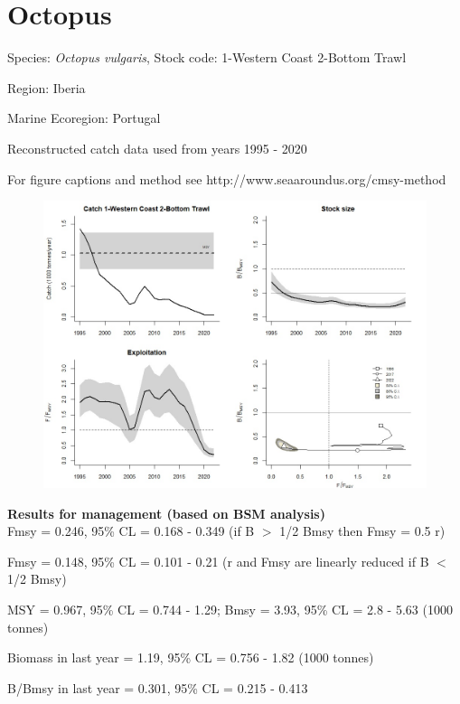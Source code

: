 \documentclass[12pt,a4paper]{article}\usepackage[]{graphicx}\usepackage[]{xcolor}
\begin{document}
    \section*{Octopus}


    Species: \emph{Octopus vulgaris}, Stock code: 1-Western Coast 2-Bottom Trawl

Region: Iberia

Marine Ecoregion: Portugal

Reconstructed catch data used from years 1995 - 2020 

 For figure captions and method see http://www.seaaroundus.org/cmsy-method

    \begin{figure}[ht]
    \centering
    \includegraphics[width=1.00\textwidth ext=.jpg type=jpg]{1-Western Coast 2-Bottom Trawl_MAN.jpg}
    \end{figure}

    \textbf{Results for management (based on BSM analysis)}\\

Fmsy = 0.246, 95\% CL = 0.168 - 0.349 (if B $>$ 1/2 Bmsy then Fmsy = 0.5 r)

Fmsy = 0.148, 95\% CL = 0.101 - 0.21 (r and Fmsy are linearly reduced if B $<$ 1/2 Bmsy)

MSY = 0.967,  95\% CL = 0.744 - 1.29; Bmsy = 3.93,  95\% CL = 2.8 - 5.63 (1000 tonnes)

Biomass in last year = 1.19, 95\% CL = 0.756 - 1.82 (1000 tonnes)

B/Bmsy in last year = 0.301, 95\% CL = 0.215 - 0.413
\end{document}
